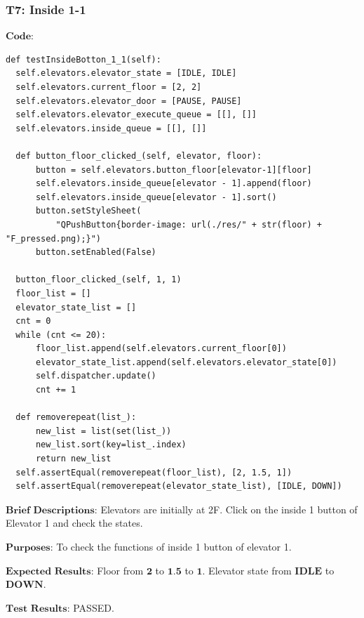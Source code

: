 \documentclass{article}
\begin{document}
\subsubsection*{T7: Inside 1-1}
$\textbf{Code:}$
\begin{lstlisting}
def testInsideBotton_1_1(self):
  self.elevators.elevator_state = [IDLE, IDLE]
  self.elevators.current_floor = [2, 2]
  self.elevators.elevator_door = [PAUSE, PAUSE]
  self.elevators.elevator_execute_queue = [[], []]
  self.elevators.inside_queue = [[], []]

  def button_floor_clicked_(self, elevator, floor):
      button = self.elevators.button_floor[elevator-1][floor]
      self.elevators.inside_queue[elevator - 1].append(floor)
      self.elevators.inside_queue[elevator - 1].sort()
      button.setStyleSheet(
          "QPushButton{border-image: url(./res/" + str(floor) + "F_pressed.png);}")
      button.setEnabled(False)

  button_floor_clicked_(self, 1, 1)
  floor_list = []
  elevator_state_list = []
  cnt = 0
  while (cnt <= 20):
      floor_list.append(self.elevators.current_floor[0])
      elevator_state_list.append(self.elevators.elevator_state[0])
      self.dispatcher.update()
      cnt += 1

  def removerepeat(list_):
      new_list = list(set(list_))
      new_list.sort(key=list_.index)
      return new_list
  self.assertEqual(removerepeat(floor_list), [2, 1.5, 1])
  self.assertEqual(removerepeat(elevator_state_list), [IDLE, DOWN])
\end{lstlisting}

$\textbf{Brief Descriptions:}$
Elevators are initially at 2F. Click on the inside 1 button of Elevator 1 and check the states.

$\textbf{Purposes:}$
To check the functions of inside 1 button of elevator 1.

$\textbf{Expected Results:}$
Floor from $\textbf{2}$ to $\textbf{1.5}$ to $\textbf{1}$. Elevator state from $\textbf{IDLE}$ to $\textbf{DOWN}$.

$\textbf{Test Results:}$
PASSED.
\end{document}
